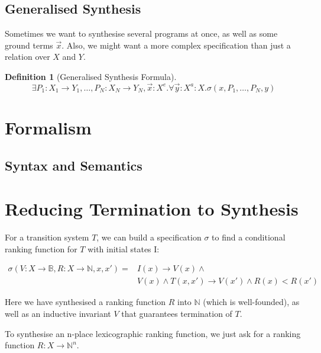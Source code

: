 \documentclass[preprint]{sigplanconf}
\theoremstyle{definition}
\newtheorem{definition}[theorem]{Definition}
\begin{document}
\subsection{Generalised Synthesis}
Sometimes we want to synthesise several programs at once, as well as some
ground terms $\vec{x}$.  Also, we might want a more complex specification
than just a relation over $X$ and $Y$.

\begin{definition}[Generalised Synthesis Formula]
 $$\exists P_1: X_1 \to Y_1, \ldots, P_N: X_N \to Y_N , \vec{x}: X^e . \forall \vec{y}: X^a: X . \sigma(x, P_1, \ldots, P_N, y) $$
\end{definition}


\section{Formalism}
\subsection{Syntax and Semantics}

\section{Reducing Termination to Synthesis}
For a transition system $T$, we can build a specification $\sigma$ to find a conditional ranking function for
$T$ with initial states I:

\begin{eqnarray}
 \sigma(V: X \to \mathbb{B}, R: X \to \mathbb{N}, x, x') = & I(x) \rightarrow V(x) \wedge \\
 & V(x) \wedge T(x, x') \rightarrow V(x') \wedge R(x) < R(x') 
\end{eqnarray}

Here we have synthesised a ranking function $R$ into $\mathbb{N}$ (which is well-founded),
as well as an inductive invariant $V$ that guarantees termination of $T$.

To synthesise an n-place lexicographic ranking function, we just ask for a ranking function
$R: X \to \mathbb{N}^n$.


{}
\end{document}
